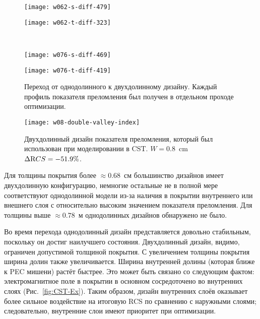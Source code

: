\begin{figure}
  \begin{minipage}[h]{0.235\textwidth}
    \texttt{[image: w062-s-diff-479]}
  \end{minipage}
  \hfill
  \begin{minipage}[h]{0.235\textwidth}
    \texttt{[image: w062-t-diff-323]}
  \end{minipage}\\
  \vspace{7pt}
  \begin{minipage}[h]{0.235\textwidth}
    \texttt{[image: w076-s-diff-469]}
  \end{minipage}
  \hfill
  \begin{minipage}[h]{0.235\textwidth}
    \texttt{[image: w076-t-diff-419]}
  \end{minipage}%
  \caption{Переход от однодолинного к двухдолинному дизайну. Каждый
    профиль показателя преломления был получен в отдельном проходе оптимизации.
    \label{fig:transition}}%
\end{figure}
\begin{figure}
  \texttt{[image: w08-double-valley-index]}%
  \caption{Двухдолинный дизайн показателя преломления, который был
    использован при моделировании в CST.  ${W=0.8}$~cm $\Delta {\textrm RCS}=-51.9\%$. 
    \label{fig:CST-index-design}}%
\end{figure}
Для толщины покрытия более ${\approx 0.68}$~см большинство дизайнов
имеет двухдолинную конфигурацию, немногие остальные не в полной мере
соответствуют однодолинной модели из-за наличия в покрытии внутреннего или
внешнего слоя с относительно высоким значением показателя
преломления. Для толщины выше ${\approx 0.78}$~м однодолинных дизайнов
обнаружено не было.

Во время перехода однодолинный дизайн представляется довольно
стабильным, поскольку он достиг наилучшего состояния. Двухдолинный
дизайн, видимо, ограничен допустимой толщиной покрытия. С увеличением
толщины покрытия ширина долин также увеличивается. Ширина внутренней
долины (которая ближе к PEC мишени) растёт быстрее. Это может быть
связано со следующим фактом: электромагнитное поле в покрытии в
основном сосредоточено во внутренних слоях
(Рис.~\ref{fig:CST-Ex}). Таким образом, дизайн внутренних слоёв
оказывает более сильное воздействие на итоговую RCS по сравнению с
наружными слоями; следовательно, внутренние слои имеют приоритет при
оптимизации.

